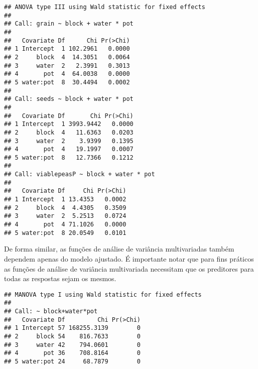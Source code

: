 
\begin{knitrout}
\color{fgcolor}\begin{kframe}
\begin{alltt}
\end{alltt}
\begin{verbatim}
## ANOVA type III using Wald statistic for fixed effects
## 
## Call: grain ~ block + water * pot
## 
##   Covariate Df      Chi Pr(>Chi)
## 1 Intercept  1 102.2961   0.0000
## 2     block  4  14.3051   0.0064
## 3     water  2   2.3991   0.3013
## 4       pot  4  64.0038   0.0000
## 5 water:pot  8  30.4494   0.0002
## 
## Call: seeds ~ block + water * pot
## 
##   Covariate Df       Chi Pr(>Chi)
## 1 Intercept  1 3993.9442   0.0000
## 2     block  4   11.6363   0.0203
## 3     water  2    3.9399   0.1395
## 4       pot  4   19.1997   0.0007
## 5 water:pot  8   12.7366   0.1212
## 
## Call: viablepeasP ~ block + water * pot
## 
##   Covariate Df     Chi Pr(>Chi)
## 1 Intercept  1 13.4353   0.0002
## 2     block  4  4.4305   0.3509
## 3     water  2  5.2513   0.0724
## 4       pot  4 71.1026   0.0000
## 5 water:pot  8 20.0549   0.0101
\end{verbatim}
\end{kframe}
\end{knitrout}

De forma similar, as funções de análise de variância multivariadas também dependem apenas do modelo ajustado. É importante notar que para fins práticos as funções de análise de variância multivariada necessitam que os preditores para todas as respostas sejam os mesmos.


\begin{knitrout}
\color{fgcolor}\begin{kframe}
\begin{alltt}
\end{alltt}
\begin{verbatim}
## MANOVA type I using Wald statistic for fixed effects
## 
## Call: ~ block+water*pot
##   Covariate Df         Chi Pr(>Chi)
## 1 Intercept 57 168255.3139        0
## 2     block 54    816.7633        0
## 3     water 42    794.0601        0
## 4       pot 36    708.8164        0
## 5 water:pot 24     68.7879        0
\end{verbatim}
\end{kframe}
\end{knitrout}

